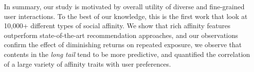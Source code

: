 In summary, our study is motivated by overall utility of diverse and fine-grained user interactions. To the best of our knowledge, this is the first work that look at 10,000+ different types of social affinity.  We show that rich affinity features outperform state-of-the-art recommendation approaches, and 
our observations confirm the effect of diminishing returns on repeated exposure, we observe that contents in the {\em long tail} tend to be more predictive, and quantified the correlation of a large variety of affinity traits with user preferences.

